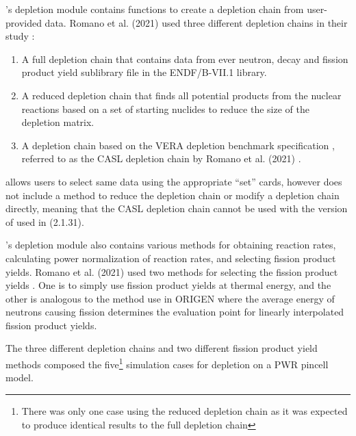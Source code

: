 \OpenMC's depletion module contains functions to create a depletion chain from
user-provided data. Romano et al. (2021) used three different depletion chains
in their study \cite{romano_depletion_2021}:
\begin{enumerate}
    \item A full depletion chain that contains data from ever neutron, decay
        and fission product yield sublibrary file in the ENDF/B-VII.1 library.
    \item A reduced depletion chain that finds all potential products from the
        nuclear reactions based on a set of starting nuclides to reduce the
        size of the depletion matrix.
    \item A depletion chain based on the VERA depletion benchmark
        specification \cite{kim_specification_2015}, referred to as the CASL
        depletion chain by Romano et al. (2021) \cite{romano_depletion_2021}.
\end{enumerate}
\SerpentTWO allows users to select same data using the appropriate ``set''
cards, however does not include a method to reduce the depletion chain or
modify a depletion chain directly, meaning that the CASL depletion chain cannot
be used with the version of \SerpentTWO used in \cite{romano_depletion_2021}
(2.1.31).

\OpenMC's depletion module also contains various methods for obtaining reaction
rates, calculating power normalization of reaction rates, and selecting fission
product yields. Romano et al. (2021) used two methods  for selecting the fission
product yields \cite{romano_depletion_2021}. One is to simply use fission product
yields at thermal energy, and the other is analogous to the method use in
ORIGEN \cite{gauld_isotopic_2011} where the average energy of neutrons causing
fission determines the evaluation point for linearly interpolated fission
product yields.

The three different depletion chains and two different fission product yield
methods composed the five\footnote{There was only one case using the reduced
depletion chain as it was expected to produce identical results to the full
depletion chain} simulation cases for depletion on a PWR pincell model.

